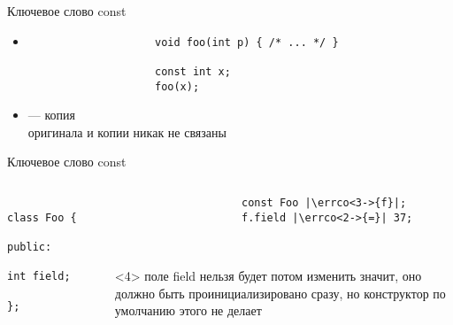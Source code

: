 \documentclass[aspectratio=169,14pt]{beamer}
\begin{document}
    \begin{frame}[fragile]{Ключевое слово const}
        \begin{itemize}
            \item<+->
                \begin{verbatim}
                    void foo(int p) { /* ... */ }

                    const int x;
                    foo(x);
                \end{verbatim}

            \item<+->  --- копия  \\
                 оригинала и  копии никак не связаны
        \end{itemize}
    \end{frame}

    \begin{frame}[fragile]{Ключевое слово const}
        \begin{columns}[T]
            \begin{column}{0.4\textwidth}
                \begin{verbatim}
                    class Foo {
                    public:
                       int field;
                    };
                \end{verbatim}
            \end{column}
            \begin{column}{0.6\textwidth}
                \begin{verbatim}
                    const Foo |\errco<3->{f}|;
                    f.field |\errco<2->{=}| 37;
                \end{verbatim}
                ~\\
                \begin{onlyenv}<4>
                    \footnotesize
                    поле field нельзя будет потом изменить значит, оно должно быть проинициализировано сразу,
                    но конструктор по умолчанию этого не делает
                \end{onlyenv}
            \end{column}
        \end{columns}
    \end{frame}
\end{document}
